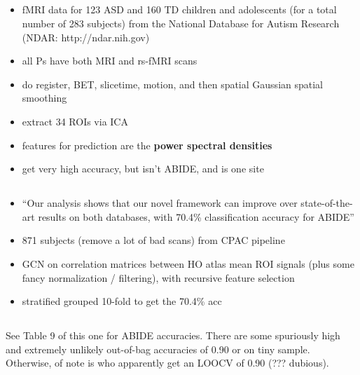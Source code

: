 \documentclass[10pt]{article}
\begin{document}
\subsection{\citet{dekhilUsingRestingState2018}}
\begin{itemize}
  \item  fMRI data for 123 ASD and 160 TD children and adolescents (for a total number of 283
  subjects) from the National Database for Autism Research (NDAR: http://ndar.nih.gov)
  \item all Ps have both MRI and rs-fMRI scans
  \item do register, BET, slicetime, motion, and then spatial Gaussian spatial smoothing
  \item extract 34 ROIs via ICA
  \item features for prediction are the \textbf{power spectral densities}
  \item get very high accuracy, but isn't ABIDE, and is one site
\end{itemize}

\subsection{\citet{parisotDiseasePredictionUsing2018}}
\begin{itemize}
  \item ``Our analysis shows that our novel framework can improve over state-of-the-art results on
  both databases, with 70.4\% classification accuracy for ABIDE''
  \item 871 subjects (remove a lot of bad scans) from CPAC pipeline
  \item GCN on correlation matrices between HO atlas mean ROI signals (plus some fancy normalization
  / filtering), with recursive feature selection
  \item stratified grouped 10-fold to get the 70.4\% acc
\end{itemize}

\subsection{\citet{sakaiMachineLearningStudies2019}}

See Table 9 of this one for ABIDE accuracies. There are some spuriously high and extremely unlikely
out-of-bag accuracies of 0.90 or on tiny sample. Otherwise, of note is
\citet{iidakaRestingStateFunctional2015} who apparently get an LOOCV of 0.90 (??? dubious).
\end{document}
